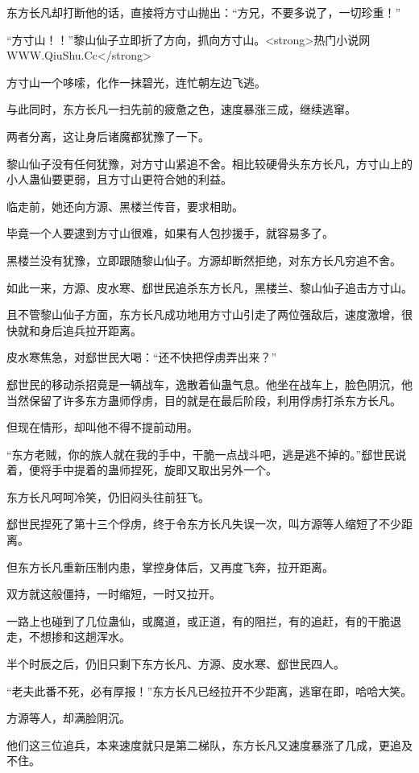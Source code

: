 \begin{this_body}
东方长凡却打断他的话，直接将方寸山抛出：“方兄，不要多说了，一切珍重！”

“方寸山！！”黎山仙子立即折了方向，抓向方寸山。<strong>热门小说网WWW.QiuShu.Cc</strong>

方寸山一个哆嗦，化作一抹碧光，连忙朝左边飞逃。

与此同时，东方长凡一扫先前的疲惫之色，速度暴涨三成，继续逃窜。

两者分离，这让身后诸魔都犹豫了一下。

黎山仙子没有任何犹豫，对方寸山紧追不舍。相比较硬骨头东方长凡，方寸山上的小人蛊仙要更弱，且方寸山更符合她的利益。

临走前，她还向方源、黑楼兰传音，要求相助。

毕竟一个人要逮到方寸山很难，如果有人包抄援手，就容易多了。

黑楼兰没有犹豫，立即跟随黎山仙子。方源却断然拒绝，对东方长凡穷追不舍。

如此一来，方源、皮水寒、郄世民追杀东方长凡，黑楼兰、黎山仙子追击方寸山。

且不管黎山仙子方面，东方长凡成功地用方寸山引走了两位强敌后，速度激增，很快就和身后追兵拉开距离。

皮水寒焦急，对郄世民大喝：“还不快把俘虏弄出来？”

郄世民的移动杀招竟是一辆战车，逸散着仙蛊气息。他坐在战车上，脸色阴沉，他当然保留了许多东方蛊师俘虏，目的就是在最后阶段，利用俘虏打杀东方长凡。

但现在情形，却叫他不得不提前动用。

“东方老贼，你的族人就在我的手中，干脆一点战斗吧，逃是逃不掉的。”郄世民说着，便将手中提着的蛊师捏死，旋即又取出另外一个。

东方长凡呵呵冷笑，仍旧闷头往前狂飞。

郄世民捏死了第十三个俘虏，终于令东方长凡失误一次，叫方源等人缩短了不少距离。

但东方长凡重新压制内患，掌控身体后，又再度飞奔，拉开距离。

双方就这般僵持，一时缩短，一时又拉开。

一路上也碰到了几位蛊仙，或魔道，或正道，有的阻拦，有的追赶，有的干脆退走，不想掺和这趟浑水。

半个时辰之后，仍旧只剩下东方长凡、方源、皮水寒、郄世民四人。

“老夫此番不死，必有厚报！”东方长凡已经拉开不少距离，逃窜在即，哈哈大笑。

方源等人，却满脸阴沉。

他们这三位追兵，本来速度就只是第二梯队，东方长凡又速度暴涨了几成，更追及不住。


\end{this_body}
